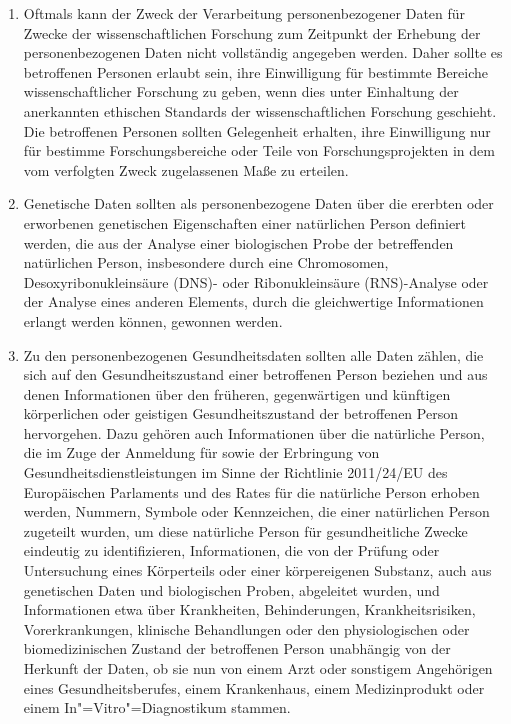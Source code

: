 \begin{enumerate}

   \item Oftmals kann der Zweck der Verarbeitung personenbezogener Daten für Zwecke der wissenschaftlichen Forschung zum
    Zeitpunkt der Erhebung der personenbezogenen Daten nicht vollständig angegeben werden. Daher sollte es betroffenen
    Personen erlaubt sein, ihre Einwilligung für bestimmte Bereiche wissenschaftlicher Forschung zu geben, wenn dies
    unter Einhaltung der anerkannten ethischen Standards der wissenschaftlichen Forschung geschieht. Die betroffenen
    Personen sollten Gelegenheit erhalten, ihre Einwilligung nur für bestimme Forschungsbereiche oder Teile von
    Forschungsprojekten in dem vom verfolgten Zweck zugelassenen Maße zu erteilen.%
   \label{itm:eg-33}
   

   \item Genetische Daten sollten als personenbezogene Daten über die ererbten oder erworbenen genetischen Eigenschaften
    einer natürlichen Person definiert werden, die aus der Analyse einer biologischen Probe der betreffenden
    natürlichen Person, insbesondere durch eine Chromosomen, Desoxyribonukleinsäure (DNS)- oder Ribonukleinsäure
    (RNS)-Analyse oder der Analyse eines anderen Elements, durch die gleichwertige Informationen erlangt werden können,
    gewonnen werden.%
   \label{itm:eg-34}
   

   \item Zu den personenbezogenen Gesundheitsdaten sollten alle Daten zählen, die sich auf den Gesundheitszustand einer
    betroffenen Person beziehen und aus denen Informationen über den früheren, gegenwärtigen und künftigen körperlichen
    oder geistigen Gesundheitszustand der betroffenen Person hervorgehen. Dazu gehören auch Informationen über die
    natürliche Person, die im Zuge der Anmeldung für sowie der Erbringung von Gesundheitsdienstleistungen im Sinne der
    Richtlinie 2011/24/EU des Europäischen Parlaments und des Rates für die natürliche Person erhoben werden, Nummern, Symbole
    oder Kennzeichen, die einer natürlichen Person zugeteilt wurden, um diese natürliche Person für gesundheitliche
    Zwecke eindeutig zu identifizieren, Informationen, die von der Prüfung oder Untersuchung eines Körperteils oder
    einer körpereigenen Substanz, auch aus genetischen Daten und biologischen Proben, abgeleitet wurden, und
    Informationen etwa über Krankheiten, Behinderungen, Krankheitsrisiken, Vorerkrankungen, klinische Behandlungen oder
    den physiologischen oder biomedizinischen Zustand der betroffenen Person unabhängig von der Herkunft der Daten, ob
    sie nun von einem Arzt oder sonstigem Angehörigen eines Gesundheitsberufes, einem Krankenhaus, einem Medizinprodukt
    oder einem In"=Vitro"=Diagnostikum stammen.%
   \label{itm:eg-35}
   

\end{enumerate}
